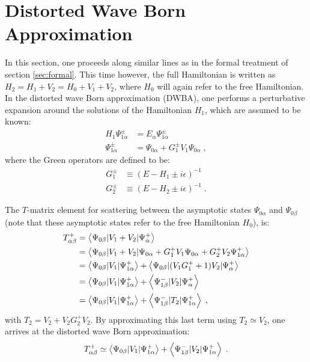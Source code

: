 \section{Distorted Wave Born Approximation} 

In this section, one proceeds along similar lines as in the formal treatment of section \ref{sec:formal}. This time however, the full Hamiltonian is written as $H_2 = H_1 + V_2 = H_0 +V_1 + V_2$, where $H_0$ will again refer to the free Hamiltonian. In the distorted wave Born approximation (DWBA), one performs a perturbative expansion around the solutions of the Hamiltonian $H_1$, which are assumed to be known:
\begin{align*}
  H_1\Psi^\pm_{1\alpha} &= E_\alpha\Psi^\pm_{1\alpha} \\
  \Psi^\pm_{1\alpha} &= \Psi_{0\alpha} + G^\pm_1 V_1 \Psi_{0\alpha} \; ,
\end{align*}
where the Green operators are defined to be:
\begin{align*}
  G^\pm_1 &\equiv (E-H_1\pm i\epsilon) ^{-1} \nonumber \\
  G^\pm_2 &\equiv (E-H_2\pm i\epsilon) ^{-1} \; .
\end{align*}

The $T$-matrix element for scattering between the asymptotic states $\Psi_{0\alpha}$ and $\Psi_{0\beta}$ (note that these asymptotic states refer to the free Hamiltonian $H_0$), is:
\begin{align*}
  T^+_{\alpha\beta} &= \left\langle \Psi_{0\beta} \vert V_1+V_2 \vert \Psi^+_\alpha \right\rangle \nonumber \\
  & = \left\langle \Psi_{0\beta} \vert V_1+V_2 \vert \Psi_{0\alpha} + G^+_1V_1\Psi_{0\alpha} + G^+_2V_2\Psi^+_{1\alpha} \right\rangle \nonumber \\
  & = \left\langle \Psi_{0\beta} \vert V_1 \vert \Psi^+_{1\alpha} \right\rangle + \left\langle \Psi_{0\beta} \vert (V_1G^+_1 + 1)V_2 \vert \Psi^+_\alpha \right\rangle \\
  & = \left\langle \Psi_{0\beta} \vert V_1 \vert \Psi^+_{1\alpha} \right\rangle + \left\langle \Psi^-_{1\beta} \vert V_2 \vert \Psi^+_\alpha \right\rangle \nonumber \\
  & = \left\langle \Psi_{0\beta} \vert V_1 \vert \Psi^+_{1\alpha} \right\rangle + \left\langle \Psi^-_{1\beta} \vert T_2 \vert \Psi^+_{1\alpha} \right\rangle \; ,
\end{align*}
with $T_2 = V_2 + V_2G^+_2V_2$. By approximating this last term using $T_2 \simeq V_2$, one arrives at the distorted wave Born approximation:
\begin{equation}
  \label{eq:tdwba}
   T^+_{\alpha\beta} \simeq \left\langle \Psi_{0\beta} \vert V_1 \vert \Psi^+_{1\alpha} \right\rangle + \left\langle \Psi^-_{1\beta} \vert V_2 \vert \Psi^+_{1\alpha} \right\rangle \; .
\end{equation}


